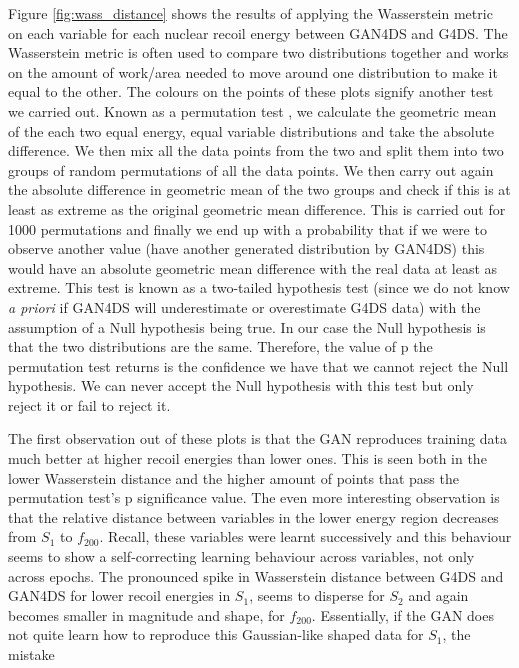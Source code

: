 \documentclass[11pt]{article} %
\begin{document}
Figure \ref{fig:wass_distance} shows the results of applying the Wasserstein metric \cite{ramdas2017wasserstein} on each variable for each nuclear recoil energy
between GAN4DS and G4DS.
The Wasserstein metric is often used to compare two distributions together and works on the amount of work/area needed to move around one distribution
to make it equal to the other.
The colours on the points of these plots signify another test we carried out.
Known as a permutation test \cite{pitman1937significance} \cite{efron1994introduction}, we calculate the geometric mean of the each two equal energy, equal variable distributions and take the absolute difference.
We then mix all the data points from the two and split them into two groups of random permutations of all the data points.
We then carry out again the absolute difference in geometric mean of the two groups and check if this is at least as extreme as the original geometric mean difference.
This is carried out for 1000 permutations and finally we end up with a probability that if we were to observe another value (have another generated distribution by GAN4DS)
this would have an absolute geometric mean difference with the real data at least as extreme.
This test is known as a two-tailed hypothesis test (since we do not know \textit{a priori} if GAN4DS will underestimate or overestimate G4DS data)
with the assumption of a Null hypothesis being true.
In our case the Null hypothesis is that the two distributions are the same.
Therefore, the value of p the permutation test returns is the confidence we have that we cannot reject the Null hypothesis.
We can never accept the Null hypothesis with this test but only reject it or fail to reject it.
\\
\par The first observation out of these plots is that the GAN reproduces training data much better at higher recoil energies
than lower ones.
This is seen both in the lower Wasserstein distance and the higher amount of points that pass
the permutation test's p significance value.
The even more interesting observation is that the relative distance between variables in the lower energy region
decreases from $S_1$ to $f_{200}$.
Recall, these variables were learnt successively and this behaviour seems to show a self-correcting learning behaviour
across variables, not only across epochs.
The pronounced spike in Wasserstein distance between G4DS and GAN4DS for lower recoil energies in $S_1$, seems to disperse for $S_2$ and
again becomes smaller in magnitude and shape, for $f_{200}$.
Essentially, if the GAN does not quite learn how to reproduce this Gaussian-like shaped data for $S_1$, the mistake
\end{document}
